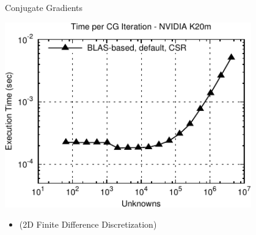 \begin{frame}[fragile]{Conjugate Gradients}

 \begin{block}{}
 
 \begin{center}
  \vspace*{-0.5cm}
  \includegraphics[width=0.8\textwidth]{figures/cg-k20m-0}
 \end{center}

 \begin{itemize}
  \item   \vspace*{-0.3cm} {\small (2D Finite Difference Discretization)}
 \end{itemize}

 \end{block}
   
\end{frame}



% 
%   
%    


